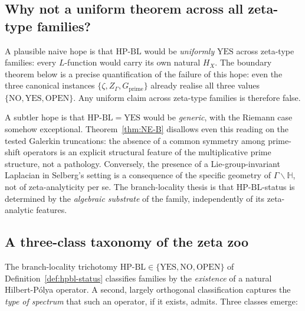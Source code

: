 \documentclass[11pt]{article}
\theoremstyle{definition}
\theoremstyle{remark}
\newcommand{\HBL}{\mathrm{HP\text{-}BL}}
\begin{document}
\subsection{Why not a uniform theorem across all zeta-type families?}

A plausible naive hope is that $\HBL$ would be \emph{uniformly}
$\mathrm{YES}$ across zeta-type families: every $L$-function would
carry its own natural $H_X$. The boundary theorem below is a precise
quantification of the failure of this hope: even the three canonical
instances $\{\zeta, Z_\Gamma, G_\mathrm{prime}\}$ already realise all
three values $\{\mathrm{NO}, \mathrm{YES}, \mathrm{OPEN}\}$. Any
uniform claim across zeta-type families is therefore false.

A subtler hope is that $\HBL = \mathrm{YES}$ would be \emph{generic},
with the Riemann case somehow exceptional. Theorem~\ref{thm:NE-B}
disallows even this reading on the tested Galerkin truncations: the
absence of a common symmetry among prime-shift operators is an
explicit structural feature of the multiplicative prime structure,
not a pathology. Conversely, the presence of a Lie-group-invariant
Laplacian in Selberg's setting is a consequence of the specific
geometry of $\Gamma\backslash\mathbb{H}$, not of zeta-analyticity per
se. The branch-locality thesis is that $\HBL$-status is determined
by the \emph{algebraic substrate} of the family, independently of
its zeta-analytic features.

\subsection{A three-class taxonomy of the zeta zoo}
\label{sec:three-class-taxonomy}

The branch-locality trichotomy
$\HBL \in \{\mathrm{YES}, \mathrm{NO}, \mathrm{OPEN}\}$ of
Definition~\ref{def:hpbl-status} classifies families by the
\emph{existence} of a natural Hilbert-P\'olya operator. A second,
largely orthogonal classification captures the \emph{type of spectrum}
that such an operator, if it exists, admits. Three classes emerge:
\end{document}
